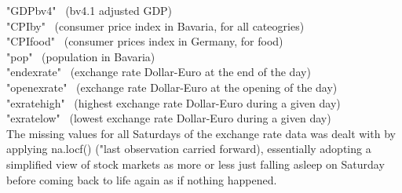 \documentclass[a4paper, 11pt]{article}
\begin{document}
"GDPbv4" \ (bv4.1 adjusted GDP) \\
"CPIby" \ (consumer price index in Bavaria, for all cateogries) \\
"CPIfood" \ (consumer prices index in Germany, for food) \\
"pop"  \ (population in Bavaria) \\
"endexrate" \ (exchange rate Dollar-Euro at the end of the day) \\
"openexrate" \ (exchange rate Dollar-Euro at the opening of the day) \\
"exratehigh" \ (highest exchange rate Dollar-Euro during a given day) \\
"exratelow" \ (lowest exchange rate Dollar-Euro during a given day) \\

The missing values for all Saturdays of the exchange rate data was dealt with by applying na.locf() ("last observation carried forward), essentially adopting a simplified view of stock markets as more or less just falling asleep on Saturday before coming back to life again as if nothing happened. \\


\end{document}
